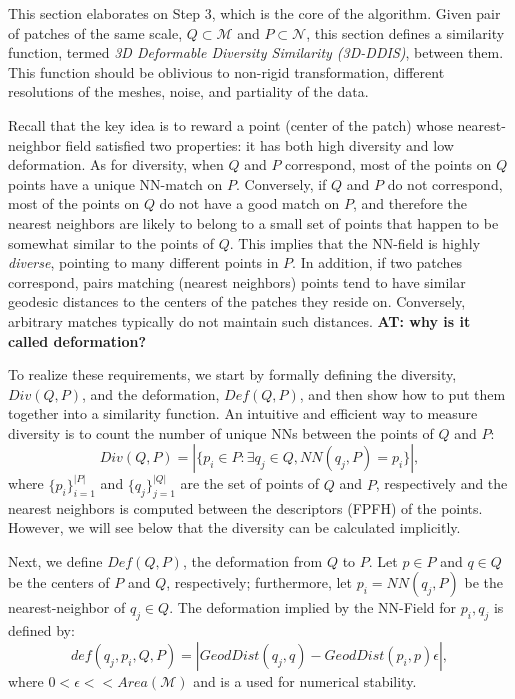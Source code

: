 \documentclass[10pt,twocolumn,letterpaper]{article}
\newcommand{\colornote}[3]{{\color{#1}\bf{#2: #3}\normalfont}}
\newcommand{\colornote}[3]{}
\newcommand {\ayellet}[1]{\colornote{blue}{AT}{#1}}
\begin{document}
This section elaborates on Step 3, which is the core of the algorithm.
Given pair of patches of the same scale, $Q \subset \mathcal{M}$ and $P \subset \mathcal{N}$, this section defines a similarity function, termed {\em 3D Deformable Diversity Similarity (3D-DDIS)}, between them.
This function should be oblivious to non-rigid transformation, different resolutions of the meshes, noise, and partiality of the data.

Recall that the key idea is to reward a point (center of the patch) whose nearest-neighbor field satisfied two properties: it has both high diversity and low deformation. 
As for diversity, when $Q$ and $P$ correspond, most of the points on $Q$ points have a unique NN-match on $P$. 
Conversely, if $Q$ and $P$ do not correspond, most of the points on $Q$  do not have a good match on $P$, and therefore the nearest neighbors are likely to belong to a small set of points that happen to be somewhat similar to the points of $Q$.
This implies that the NN-field is highly \textit{diverse}, pointing to many different points in $P$.
In addition, if two patches correspond, pairs matching (nearest neighbors) points tend to have similar geodesic distances to the centers of the patches they reside on.
Conversely, arbitrary matches typically do not maintain such distances.
\ayellet{why is it called deformation?}

To realize these requirements, we start by formally defining the diversity, $Div(Q,P)$, and  the deformation, $Def(Q,P)$, and then show how to put them together into a similarity function.
An intuitive and efficient way to measure diversity is to count the number of unique NNs between the points of  $Q$ and $P$:
\begin{equation}
\label{eq:diversity}
Div(Q,P)=|\{p_i\in P:\exists q_j\in Q,NN(q_j,P)=p_i\}|,
\end{equation}
where  $\{p_i\}_{i=1}^{|P|}$ and $\{q_j\}_{j=1}^{|Q|}$ are the set of points of $Q$ and $P$, respectively and the nearest neighbors is computed between the descriptors (FPFH) of the points.
However, we will see below that the diversity can be calculated implicitly.

Next, we define $Def(Q,P)$, the deformation from  $Q$ to $P$.
Let $p \in P$ and $q \in Q$ be the centers of $P$ and $Q$, respectively;
furthermore, let $p_i= NN(q_j,P)$ be the nearest-neighbor of  $q_j \in Q$.
The deformation implied by the NN-Field for ${p_i,q_j}$ is defined by:
\begin{equation}
def(q_j,p_i,Q,P)= |{GeodDist(q_j,q)-GeodDist(p_i,p)}\epsilon|,
\end{equation}
where $0<\epsilon << Area(\mathcal{M})$ and is a used for numerical stability.
\end{document}
